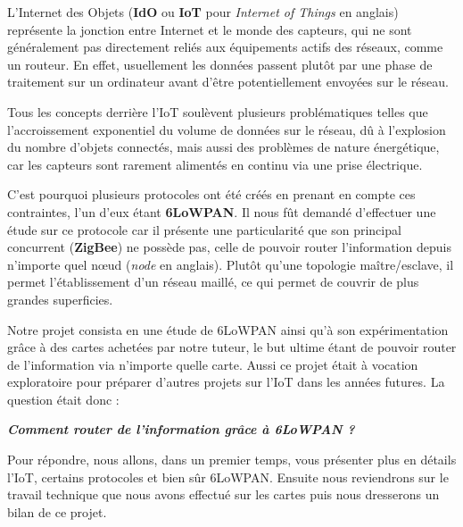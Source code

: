 
L'Internet des Objets (\textbf{IdO} ou \textbf{IoT} pour \textit{Internet of Things} en anglais) représente la jonction entre Internet et le monde des capteurs, qui ne sont généralement pas directement reliés aux équipements actifs des réseaux, comme un routeur. En effet, usuellement les données passent plutôt par une phase de traitement sur un ordinateur avant d'être potentiellement envoyées sur le réseau.

Tous les concepts derrière l'IoT soulèvent plusieurs problématiques telles que l'accroissement exponentiel du volume de données sur le réseau, dû à l'explosion du nombre d'objets connectés, mais aussi des problèmes de nature énergétique, car les capteurs sont rarement alimentés en continu via une prise électrique.

C'est pourquoi plusieurs protocoles ont été créés en prenant en compte ces contraintes, l'un d'eux étant \textbf{6LoWPAN}. Il nous fût demandé d'effectuer une étude sur ce protocole car il présente une particularité que son principal concurrent (\textbf{ZigBee}) ne possède pas, celle de pouvoir router l'information depuis n'importe quel nœud (\textit{node} en anglais). Plutôt qu’une topologie maître/esclave, il permet l’établissement d’un réseau maillé, ce qui permet de couvrir de plus grandes superficies.

Notre projet consista en une étude de 6LoWPAN ainsi qu'à son expérimentation grâce à des cartes achetées par notre tuteur, le but ultime étant de pouvoir router de l'information via n'importe quelle carte. Aussi ce projet était à vocation exploratoire pour préparer d'autres projets sur l'IoT dans les années futures. La question était donc :

\begin{center}
\textbf{\textit{Comment router de l'information grâce à 6LoWPAN ?}}
\end{center}

Pour répondre, nous allons, dans un premier temps, vous présenter plus en détails l'IoT, certains protocoles et bien sûr 6LoWPAN. Ensuite nous reviendrons sur le travail technique que nous avons effectué sur les cartes puis nous dresserons un bilan de ce projet.
